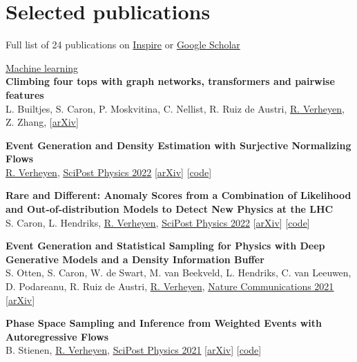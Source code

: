 \documentclass[a4paper,11pt]{article}
\begin{document}
\section{Selected publications}
Full list of 24 publications on \href{https://inspirehep.net/authors/1777870?ui-citation-summary=true}{Inspire} or \href{https://scholar.google.com/citations?user=MRTAm7UAAAAJ&hl=en&oi=ao}{Google Scholar}

\underline{\Large{Machine learning}} \\ [5pt]
\textbf{Climbing four tops with graph networks, transformers and pairwise features} \\
L. Builtjes, S. Caron, P. Moskvitina, C. Nellist, R. Ruiz de Austri, \underline{R. Verheyen}, Z. Zhang,
[\href{https://arxiv.org/pdf/2211.05143.pdf}{arXiv}]


\textbf{Event Generation and Density Estimation with Surjective Normalizing Flows} \\
\underline{R. Verheyen}, 
\href{https://scipost.org/10.21468/SciPostPhys.13.3.047}{\underline{SciPost Physics 2022}} [\href{https://arxiv.org/abs/2205.01697}{arXiv}] [\href{https://github.com/rbvh/surflows}{code}]

\textbf{Rare and Different: Anomaly Scores from a Combination of Likelihood and Out-of-distribution Models to Detect New Physics at the LHC} \\
S. Caron, L. Hendriks, \underline{R. Verheyen},
\href{https://scipost.org/10.21468/SciPostPhys.12.1.043}{\underline{SciPost Physics 2022}} [\href{https://arxiv.org/pdf/2105.14027.pdf}{arXiv}] [\href{https://github.com/bostdiek/DarkMachines-UnsupervisedChallenge}{code}]

\textbf{Event Generation and Statistical Sampling for Physics with Deep Generative Models and a Density Information Buffer} \\
S. Otten, S. Caron, W. de Swart, M. van Beekveld, L. Hendriks, C. van Leeuwen, D. Podareanu, R. Ruiz de Austri, \underline{R. Verheyen}, 
\href{https://www.nature.com/articles/s41467-021-22616-z}{\underline{Nature Communications 2021}} [\href{https://arxiv.org/abs/1901.00875}{arXiv}]

\textbf{Phase Space Sampling and Inference from Weighted Events with Autoregressive Flows} \\
B. Stienen, \underline{R. Verheyen}, 
\href{https://scipost.org/10.21468/SciPostPhys.10.2.038}{\underline{SciPost Physics 2021}} [\href{https://arxiv.org/pdf/2011.13445.pdf}{arXiv}] [\href{https://github.com/rbvh/PhaseSpaceAutoregressiveFlow}{code}]
\end{document}
